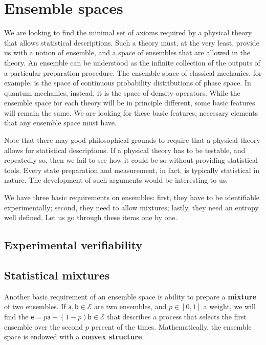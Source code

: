 \documentclass[10pt,twocolumn, nofootinbib]{revtex4-2}
\newcommand{\ens}[1][e] {\mathsf{#1}} %
\newcommand{\Ens}[1][E] {\mathcal{#1}} %
\begin{document}
\section{Ensemble spaces}

We are looking to find the minimal set of axioms required by a physical theory that allows statistical descriptions. Such a theory must, at the very least, provide us with a notion of ensemble, and a space of ensembles that are allowed in the theory. An ensemble can be understood as the infinite collection of the outputs of a particular preparation procedure. The ensemble space of classical mechanics, for example, is the space of continuous probability distributions of phase space. In quantum mechanics, instead, it is the space of density operators. While the ensemble space for each theory will be in principle different, some basic features will remain the same. We are looking for these basic features, necessary elements that any ensemble space must have.

Note that there may good philosophical grounds to require that a physical theory allows for statistical descriptions. If a physical theory has to be testable, and repeatedly so, then we fail to see how it could be so without providing statistical tools. Every state preparation and measurement, in fact, is typically statistical in nature. The development of such arguments would be interesting to us.

We have three basic requirements on ensembles: first, they have to be identifiable experimentally; second, they need to allow mixtures; lastly, they need an entropy well defined. Let us go through these items one by one.

\subsection{Experimental verifiability}

\subsection{Statistical mixtures}
Another basic requirement of an ensemble space is ability to prepare a \textbf{mixture} of two ensembles. If $\ens[a], \ens[b] \in \Ens$ are two ensembles, and $p \in [0,1]$ a weight, we will find the $\ens = p \ens[a] + (1-p) \ens[b] \in \Ens$ that describes a process that selects the first ensemble over the second $p$ percent of the times. Mathematically, the ensemble space is endowed with a \textbf{convex structure}.
\end{document}
